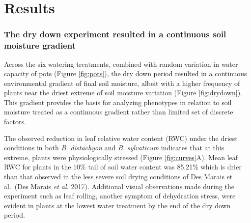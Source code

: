 \documentclass[jou,floatsintext]{apa6}
\begin{document}
\hypertarget{results}{%
\section{Results}\label{results}}

\hypertarget{the-dry-down-experiment-resulted-in-a-continuous-soil-moisture-gradient}{%
\subsubsection{The dry down experiment resulted in a continuous soil moisture gradient}\label{the-dry-down-experiment-resulted-in-a-continuous-soil-moisture-gradient}}

Across the six watering treatments, combined with random variation in water capacity of pots (Figure \ref{fig:pots}), the dry down period resulted in a continuous environmental gradient of final soil moisture, albeit with a higher frequency of plants near the driest extreme of soil moisture variation (Figure \ref{fig:drydown}). This gradient provides the basis for analyzing phenotypes in relation to soil moisture treated as a continuous gradient rather than limited set of discrete factors.

The observed reduction in leaf relative water content (RWC) under the driest conditions in both \emph{B. distachyon} and \emph{B. sylvaticum} indicates that at this extreme, plants were physiologically stressed (Figure \ref{fig:curves}A). Mean leaf RWC for plants in the 10\% tail of soil water content was 85.21\% which is drier than that observed in the less severe soil drying conditions of Des Marais et al.~(Des Marais \emph{et al.} 2017). Additional visual observations made during the experiment such as leaf rolling, another symptom of dehydration stress, were evident in plants at the lowest water treatment by the end of the dry down period.
\end{document}
